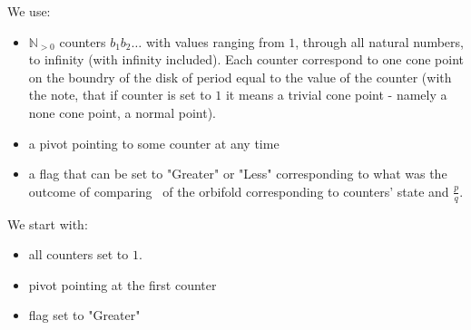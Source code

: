 
We use: 
\begin{itemize}
\item $\mathbb{N}_{>0}$ counters $b_1b_2\dots$ 
with values ranging from $1$, through all natural numbers, to infinity 
(with infinity included). Each counter correspond to one cone point 
on the boundry of the disk of period equal to the value of the counter (with the note, that 
if counter is set to $1$ it means a trivial cone point - namely a none cone point, a normal point). 
\item a pivot pointing to some counter at any time
\item a flag that can be set to "Greater" or "Less" corresponding to what was 
the outcome of comparing \Eoc\ of the orbifold corresponding to counters' state and 
$\frac{p}{q}$.  
\end{itemize}

We start with:
\begin{itemize}
\item all counters set to $1$. 
\item pivot pointing at the first counter
\item flag set to "Greater"
\end{itemize}


